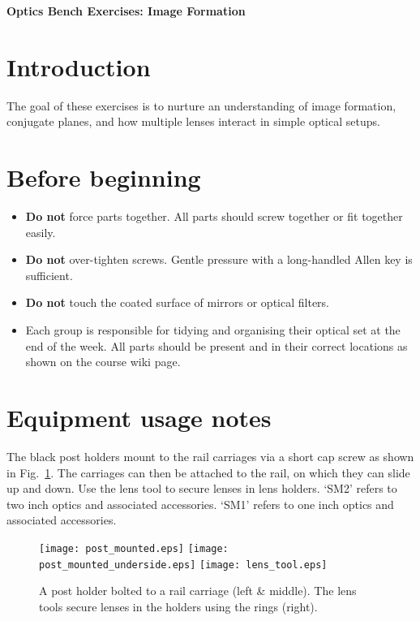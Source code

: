 \documentclass[a4paper]{report}
\begin{document}
	
	
	
	
	\setcounter{secnumdepth}{2}
	
	\begin{center}
		\textbf{\Large{Optics Bench Exercises: Image Formation}}
	\end{center}
	
	\section{Introduction}
	The goal of these exercises is to nurture an understanding of image formation, conjugate planes, and how multiple lenses interact in simple optical setups.
	
	
	\section{Before beginning}
	\begin{itemize}
		\item \textbf{Do not} force parts together. All parts should screw together or fit together easily.
		\item \textbf{Do not} over-tighten screws. Gentle pressure with a long-handled Allen key is sufficient. 
		\item \textbf{Do not} touch the coated surface of mirrors or optical filters. 
		\item Each group is responsible for tidying and organising their optical set at the end of the week. All parts should be present and in their correct locations as shown on the course wiki page. 
		
	\end{itemize}
	
	\section{Equipment usage notes}
	The black post holders mount to the rail carriages via a short cap screw as shown in Fig.~\ref{fig:post}. 
	The carriages can then be attached to the rail, on which they can slide up and down. 
	Use the lens tool to secure lenses in lens holders. 
	`SM2' refers to two inch optics and associated accessories. 
	`SM1' refers to one inch optics and associated accessories. 
	
	\begin{figure}[h]
		\center
		\texttt{[image: post\_mounted.eps]}
		\texttt{[image: post\_mounted\_underside.eps]}
		\texttt{[image: lens\_tool.eps]}
		\caption{A post holder bolted to a rail carriage (left \& middle).
			The lens tools secure lenses in the holders using the rings (right).}
		\label{fig:post}
	\end{figure}
	
\end{document}
